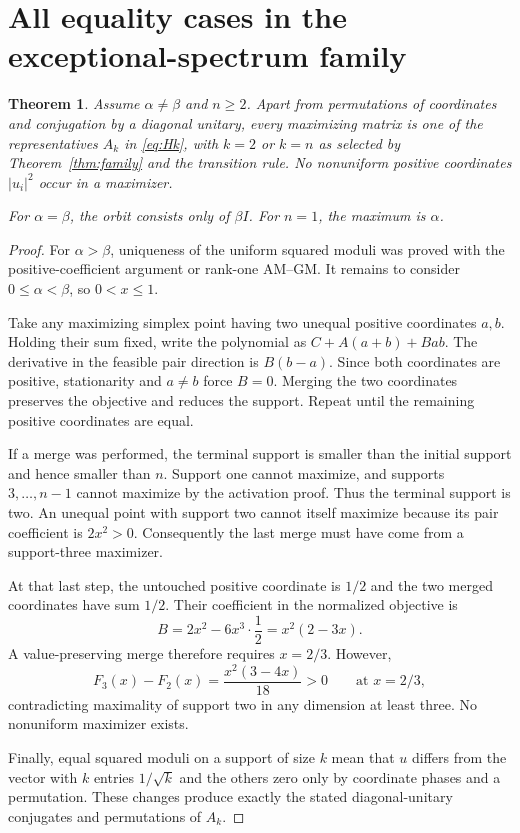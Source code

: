 \documentclass[11pt]{article}
\newtheorem{theorem}{Theorem}[section]
\theoremstyle{definition}\newtheorem{definition}[theorem]{Definition}
\theoremstyle{remark}\newtheorem{remark}[theorem]{Remark}
\begin{document}
\section{All equality cases in the exceptional-spectrum family}
\begin{theorem}\label{thm:equality}
Assume $\alpha\ne\beta$ and $n\geq2$. Apart from permutations of coordinates and conjugation by a diagonal unitary, every maximizing matrix is one of the representatives $A_k$ in \eqref{eq:Hk}, with $k=2$ or $k=n$ as selected by Theorem~\ref{thm:family} and the transition rule. No nonuniform positive coordinates $|u_i|^2$ occur in a maximizer.

For $\alpha=\beta$, the orbit consists only of $\beta I$. For $n=1$, the maximum is $\alpha$.
\end{theorem}
\begin{proof}
For $\alpha>\beta$, uniqueness of the uniform squared moduli was proved with the positive-coefficient argument or rank-one AM--GM. It remains to consider $0\leq\alpha<\beta$, so $0<x\leq1$.

Take any maximizing simplex point having two unequal positive coordinates $a,b$. Holding their sum fixed, write the polynomial as $C+A(a+b)+Bab$. The derivative in the feasible pair direction is $B(b-a)$. Since both coordinates are positive, stationarity and $a\ne b$ force $B=0$. Merging the two coordinates preserves the objective and reduces the support. Repeat until the remaining positive coordinates are equal.

If a merge was performed, the terminal support is smaller than the initial support and hence smaller than $n$. Support one cannot maximize, and supports $3,\ldots,n-1$ cannot maximize by the activation proof. Thus the terminal support is two. An unequal point with support two cannot itself maximize because its pair coefficient is $2x^2>0$. Consequently the last merge must have come from a support-three maximizer.

At that last step, the untouched positive coordinate is $1/2$ and the two merged coordinates have sum $1/2$. Their coefficient in the normalized objective is
\[
 B=2x^2-6x^3\cdot\frac12=x^2(2-3x).
\]
A value-preserving merge therefore requires $x=2/3$. However,
\[
 F_3(x)-F_2(x)=\frac{x^2(3-4x)}{18}>0
 \qquad\text{at }x=2/3,
\]
contradicting maximality of support two in any dimension at least three. No nonuniform maximizer exists.

Finally, equal squared moduli on a support of size $k$ mean that $u$ differs from the vector with $k$ entries $1/\sqrt k$ and the others zero only by coordinate phases and a permutation. These changes produce exactly the stated diagonal-unitary conjugates and permutations of $A_k$.
\end{proof}
\end{document}
